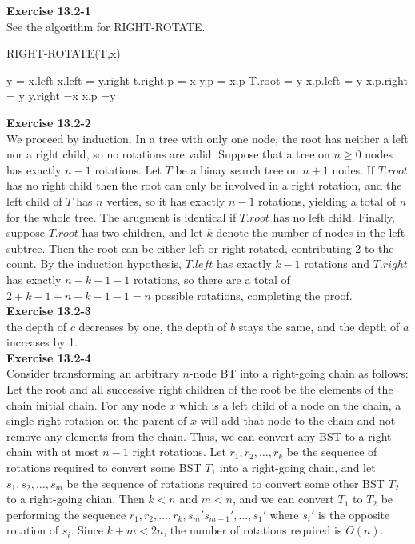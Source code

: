 \documentclass{article}
\begin{document}
\noindent\textbf{ Exercise 13.2-1} \\

See the algorithm for RIGHT-ROTATE.\\


\begin{algorithm}
\caption{RIGHT-ROTATE(T,x)}
\begin{algorithmic}
\State y = x.left
\State x.left = y.right
\State t.right.p = x
\EndIf
\State y.p = x.p
\State T.root = y
\State x.p.left = y
\Else
\State x.p.right = y
\EndIf
\State y.right =x
\State x.p =y
\end{algorithmic}
\end{algorithm}

\noindent\textbf{Exercise 13.2-2}\\

We proceed by induction.  In a tree with only one node, the root has neither a left nor a right child, so no rotations are valid.  Suppose that a tree on $n\geq 0$ nodes has exactly $n-1$ rotations.  Let $T$ be a binay search tree on $n+1$ nodes.  If $T.root$ has no right child then the root can only be involved in a right rotation, and the left child of $T$ has $n$ verties, so it has exactly $n-1$ rotations, yielding a total of $n$ for the whole tree.  The arugment is identical if $T.root$ has no left child.  Finally, suppose $T.root$ has two children, and let $k$ denote the number of nodes in the left subtree.  Then the root can be either left or right rotated, contributing 2 to the count.  By the induction hypothesis, $T.left$ has exactly $k-1$ rotations and $T.right$ has exactly $n-k-1-1$ rotations, so there are a total of $2 + k-1 + n-k-1-1 = n$ possible rotations, completing the proof. \\

\noindent\textbf{ Exercise 13.2-3} \\

the depth of $c$ decreases by one, the depth of $b$ stays the same, and the depth of $a$ increases by 1.\\

\noindent\textbf{Exercise 13.2-4}\\

Consider transforming an arbitrary $n$-node BT into a right-going chain as follows: Let the root and all successive right children of the root be the elements of the chain initial chain.  For any node $x$ which is a left child of a node on the chain, a single right rotation on the parent of $x$ will add that node to the chain and not remove any elements from the chain.  Thus, we can convert any BST to a right chain with at most $n-1$ right rotations.  Let $r_1, r_2, \ldots, r_k$ be the sequence of rotations required to convert some BST $T_1$ into a right-going chain, and let $s_1, s_2, \ldots, s_m$ be the sequence of rotations required to convert some other BST $T_2$ to a right-going chian.  Then $k < n$ and $m < n$, and we can convert $T_1$ to $T_2$ be performing the sequence $r_1, r_2, \ldots, r_k, s_m' s_{m-1}', \ldots, s_1'$ where $s_i'$ is the opposite rotation of $s_i$.  Since $k+m < 2n$, the number of rotations required is $O(n)$. \\
\end{document}
